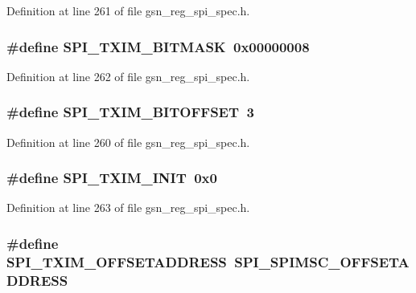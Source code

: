 Definition at line 261 of file gsn\_\-reg\_\-spi\_\-spec.h.

\hypertarget{a00573_a56b039c34622fe50892014688d6bc8b7}{
\subsubsection[{SPI\_\-TXIM\_\-BITMASK}]{\setlength{\rightskip}{0pt plus 5cm}\#define SPI\_\-TXIM\_\-BITMASK~0x00000008}}
\label{a00573_a56b039c34622fe50892014688d6bc8b7}


Definition at line 262 of file gsn\_\-reg\_\-spi\_\-spec.h.

\hypertarget{a00573_adf4b224361b5c4229b61a2ae0568c637}{
\subsubsection[{SPI\_\-TXIM\_\-BITOFFSET}]{\setlength{\rightskip}{0pt plus 5cm}\#define SPI\_\-TXIM\_\-BITOFFSET~3}}
\label{a00573_adf4b224361b5c4229b61a2ae0568c637}


Definition at line 260 of file gsn\_\-reg\_\-spi\_\-spec.h.

\hypertarget{a00573_a2a0cd61805c483762171647939f87d1d}{
\subsubsection[{SPI\_\-TXIM\_\-INIT}]{\setlength{\rightskip}{0pt plus 5cm}\#define SPI\_\-TXIM\_\-INIT~0x0}}
\label{a00573_a2a0cd61805c483762171647939f87d1d}


Definition at line 263 of file gsn\_\-reg\_\-spi\_\-spec.h.

\hypertarget{a00573_a4e93dd5a3f94cbdf23bc375c9e3676fd}{
\subsubsection[{SPI\_\-TXIM\_\-OFFSETADDRESS}]{\setlength{\rightskip}{0pt plus 5cm}\#define SPI\_\-TXIM\_\-OFFSETADDRESS~SPI\_\-SPIMSC\_\-OFFSETADDRESS}}
\label{a00573_a4e93dd5a3f94cbdf23bc375c9e3676fd}


